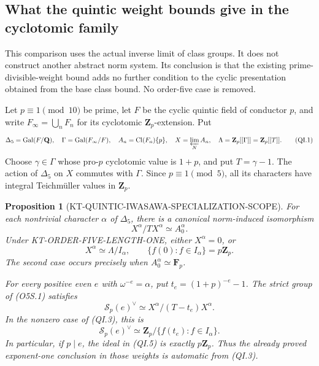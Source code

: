 \documentclass[11pt,a4paper]{article}
\newtheorem{proposition}[theorem]{Proposition}
\theoremstyle{definition}
\begin{document}


\subsection{What the quintic weight bounds give in the cyclotomic family}
\label{sec:kt-quintic-iwasawa-specialization}

This comparison uses the actual inverse limit of class groups.  It
does not construct another abstract norm system.  Its conclusion is
that the existing prime-divisible-weight bound adds no further
condition to the cyclic presentation obtained from the base class
bound.  No order-five case is removed.

Let $p\equiv1\pmod {10}$ be prime, let $F$ be the cyclic quintic
field of conductor $p$, and write $F_\infty=\bigcup_nF_n$ for its
cyclotomic $\mathbf Z_p$-extension.  Put
\[
 \Delta_5=\operatorname{Gal}(F/\mathbf Q),\quad
 \Gamma=\operatorname{Gal}(F_\infty/F),\quad
 A_n=\operatorname{Cl}(F_n)\{p\},\quad
 X=\varprojlim_{N}A_n,\quad
 \Lambda=\mathbf Z_p[[\Gamma]]=\mathbf Z_p[[T]].
 \tag{QI.1}
\]
Choose $\gamma\in\Gamma$ whose pro-$p$ cyclotomic value is $1+p$,
and put $T=\gamma-1$.  The action of $\Delta_5$ on $X$ commutes
with $\Gamma$.  Since $p\equiv1\pmod5$, all its characters have
integral Teichm\"uller values in $\mathbf Z_p$.

\begin{proposition}[KT-QUINTIC-IWASAWA-SPECIALIZATION-SCOPE]
For each nontrivial character $\alpha$ of $\Delta_5$, there is a
canonical norm-induced isomorphism
\[
                    X^\alpha/TX^\alpha\simeq A_0^\alpha.
 \tag{QI.2}
\]
Under KT-ORDER-FIVE-LENGTH-ONE, either $X^\alpha=0$, or
\[
       X^\alpha\simeq\Lambda/I_\alpha,\qquad
       \{f(0):f\in I_\alpha\}=p\mathbf Z_p.             \tag{QI.3}
\]
The second case occurs precisely when $A_0^\alpha\simeq\mathbf F_p$.

For every positive even $e$ with $\omega^{-e}=\alpha$, put
$t_e=(1+p)^{-e}-1$.  The strict group of (O5S.1) satisfies
\[
 \mathcal S_p(e)^\vee\simeq
       X^\alpha/(T-t_e)X^\alpha.
 \tag{QI.4}
\]
In the nonzero case of (QI.3), this is
\[
 \mathcal S_p(e)^\vee\simeq
   \mathbf Z_p/\{f(t_e):f\in I_\alpha\}.                \tag{QI.5}
\]
In particular, if $p\mid e$, the ideal in (QI.5) is exactly
$p\mathbf Z_p$.  Thus the already proved exponent-one conclusion
in those weights is automatic from (QI.3).
\end{proposition}
\end{document}
